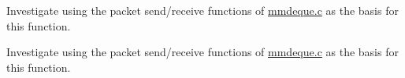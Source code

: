 
\begin{DoxyRefList}
\item[\label{todo__todo000002}%
\hypertarget{todo__todo000002}{}%
Global \hyperlink{msgdeque_8h_a66e44a1525ad0ea442ed7b3dc1686df3}{msgdeque\-\_\-rec\-\_\-byte\-\_\-stream} (M\-S\-G\-C\-E\-L\-L $\ast$msgcellp, size\-\_\-t $\ast$bytes\-\_\-received)]Investigate using the packet send/receive functions of \hyperlink{mmdeque_8c}{mmdeque.\-c} as the basis for this function. 
\item[\label{todo__todo000001}%
\hypertarget{todo__todo000001}{}%
Global \hyperlink{msgdeque_8h_aed54e36c001d914878bc7b9d493301ac}{msgdeque\-\_\-send\-\_\-byte\-\_\-stream} (M\-S\-G\-C\-E\-L\-L $\ast$msgcellp, void $\ast$pdata, size\-\_\-t datalen)]Investigate using the packet send/receive functions of \hyperlink{mmdeque_8c}{mmdeque.\-c} as the basis for this function.
\end{DoxyRefList}